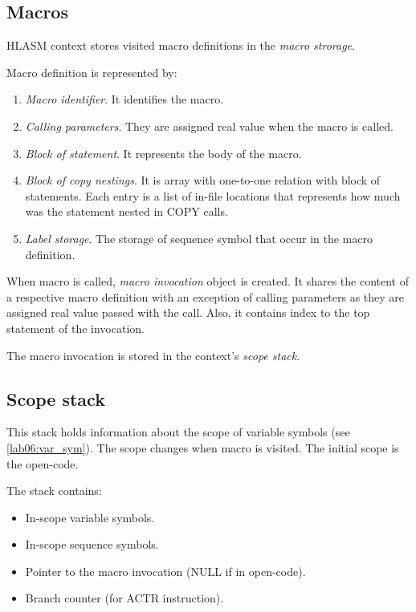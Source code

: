 \subsection{Macros}

HLASM context stores visited macro definitions in the \emph{macro strorage}. 

Macro definition is represented by:
\begin{enumerate}
	\item \emph{Macro identifier}. It identifies the macro.
	\item \emph{Calling parameters}. They are assigned real value when the macro is called.
	\item \emph{Block of statement}. It represents the body of the macro.
	\item \emph{Block of copy nestings}. It is array with one-to-one relation with block of statements. Each entry is a list of in-file locations that represents how much was the statement nested in COPY calls.
	\item \emph{Label storage}. The storage of sequence symbol that occur in the macro definition.
\end{enumerate}

When macro is called, \emph{macro invocation} object is created. It shares the content of a respective macro definition with an exception of calling parameters as they are assigned real value passed with the call. Also, it contains index to the top statement of the invocation.

The macro invocation is stored in the context's \emph{scope stack}.

\subsection{Scope stack}

This stack holds information about the scope of variable symbols (see \cref{lab06:var_sym}). The scope changes when macro is visited. The initial scope is the open-code. 


The stack contains:
\begin{itemize}
	\item In-scope variable symbols.
	\item In-scope sequence symbols.
	\item Pointer to the macro invocation (NULL if in open-code).
	\item Branch counter (for ACTR instruction).
\end{itemize}

